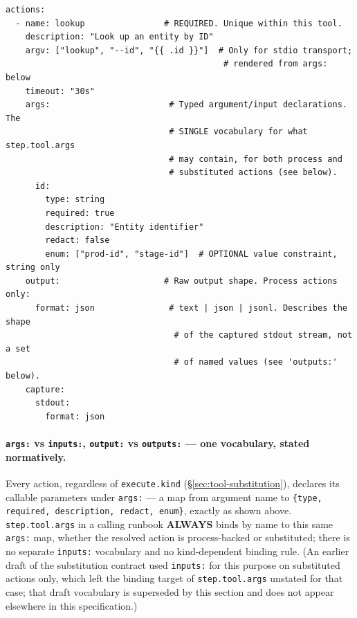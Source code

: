 \begin{verbatim}
actions:
  - name: lookup                # REQUIRED. Unique within this tool.
    description: "Look up an entity by ID"
    argv: ["lookup", "--id", "{{ .id }}"]  # Only for stdio transport;
                                            # rendered from args: below
    timeout: "30s"
    args:                        # Typed argument/input declarations. The
                                 # SINGLE vocabulary for what step.tool.args
                                 # may contain, for both process and
                                 # substituted actions (see below).
      id:
        type: string
        required: true
        description: "Entity identifier"
        redact: false
        enum: ["prod-id", "stage-id"]  # OPTIONAL value constraint, string only
    output:                     # Raw output shape. Process actions only:
      format: json               # text | json | jsonl. Describes the shape
                                  # of the captured stdout stream, not a set
                                  # of named values (see 'outputs:' below).
    capture:
      stdout:
        format: json
\end{verbatim}

\paragraph{\texttt{args:} vs \texttt{inputs:}, \texttt{output:} vs
\texttt{outputs:} --- one vocabulary, stated normatively.} Every action,
regardless of \texttt{execute.kind} (\S\ref{sec:tool-substitution}),
declares its callable parameters under \texttt{args:} --- a map from
argument name to \texttt{\{type, required, description, redact, enum\}},
exactly as shown above. \texttt{step.tool.args} in a calling runbook \textbf{ALWAYS}
binds by name to this same \texttt{args:} map, whether the resolved action
is process-backed or substituted; there is no separate \texttt{inputs:}
vocabulary and no kind-dependent binding rule. (An earlier draft of the
substitution contract used \texttt{inputs:} for this purpose on substituted
actions only, which left the binding target of \texttt{step.tool.args}
unstated for that case; that draft vocabulary is superseded by this
section and does not appear elsewhere in this specification.)

